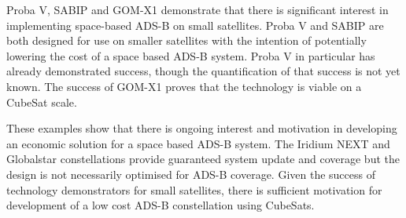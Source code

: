 Proba V, SABIP and GOM-X1 demonstrate that there is significant interest in implementing space-based ADS-B on small satellites. Proba V and SABIP are both designed for use on smaller  satellites with the intention of potentially lowering the cost of a space based ADS-B system. Proba V in particular has already demonstrated success, though the quantification of that success is not yet known. The success of GOM-X1 proves that the technology is viable on a CubeSat scale.

These examples show that there is ongoing interest and motivation in developing an economic solution for a space based ADS-B system. The Iridium NEXT and Globalstar constellations provide guaranteed system update and coverage but the design is not necessarily optimised for ADS-B coverage. Given the success of technology demonstrators for small satellites, there is sufficient motivation for development of a low cost ADS-B constellation using CubeSats. 